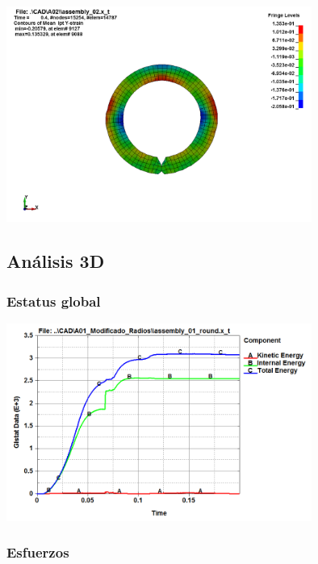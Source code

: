 \begin{center}
\includegraphics[width=0.75\textwidth]{src/ch4/strain_y_02.png}
\label{fig:efective_plastic_strain}
\end{center}



\subsection{Análisis 3D}


\subsubsection{Estatus global}

\begin{center}
\includegraphics[width=0.75\textwidth]{src/ch4/energy_status_3d.png}
\label{fig:von_mises_3D_01}
\end{center}

\subsubsection{Esfuerzos}


